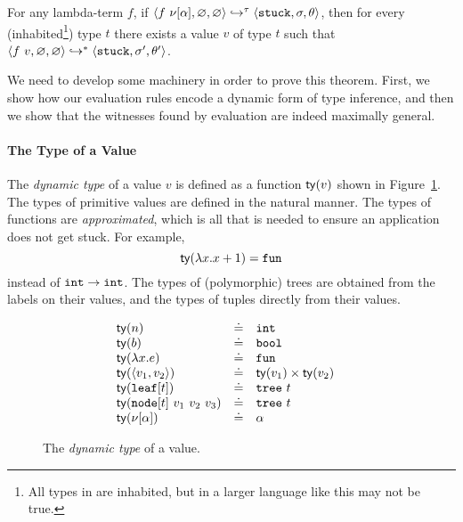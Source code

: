 \begin{thm}
\label{thm:soundness}
  For any lambda-term $f$, if
  \hbox{$\langle f\ \nu[\alpha], \varnothing, \varnothing \rangle \hookrightarrow^{\tau} \langle \mathtt{stuck}, \sigma, \theta \rangle$,}
  then for every
  (inhabited\footnote{All types in \lang are inhabited, but in a larger language like \ocaml this may not be true.})
  type
  $t$ there exists a value $v$ of type $t$ such that
  $\langle f\ v, \varnothing, \varnothing \rangle \hookrightarrow^{*} \langle \mathtt{stuck}, \sigma', \theta' \rangle{}$.
\end{thm}

We need to develop some machinery in order to prove this theorem.
First, we show how our evaluation rules encode a dynamic form of
type inference, and then we show that the witnesses found by
evaluation are indeed maximally general.

\paragraph{The Type of a Value} The \emph{dynamic type}
of a value $v$ is defined as a function $\mathsf{ty}(v)$ shown
in Figure~\ref{fig:typeof}.
%
The types of primitive values are defined in the natural manner.
%
The types of functions are \emph{approximated}, which is all
that is needed to ensure an application does not get stuck.
%
For example,
$$\mathsf{ty}(\lambda x. x + 1) = \mathtt{fun}$$
instead of $\mathtt{int} \rightarrow \mathtt{int}$.
%
The types of (polymorphic) trees are obtained from the labels on their
values, and the types of tuples directly from their values.

\begin{figure}[t]
\[ \begin{array}{lcll}
    \mathsf{ty}(n)   & \doteq & \mathtt{int} & \\
    \mathsf{ty}(b)   & \doteq & \mathtt{bool} & \\
    \mathsf{ty}(\lambda x. e) & \doteq & \mathtt{fun} \\
    \mathsf{ty}(\langle v_1, v_2 \rangle) & \doteq & \mathsf{ty}(v_1) \times \mathsf{ty}(v_2) \\
    \mathsf{ty}(\mathtt{leaf}[t]) & \doteq & \mathtt{tree}\ t \\
    \mathsf{ty}(\mathtt{node}[t]\ v_1\ v_2\ v_3) & \doteq & \mathtt{tree}\ t \\
    \mathsf{ty}(\nu[\alpha]) & \doteq & \alpha \\
  \end{array} \]
\caption{The \emph{dynamic type} of a value.}
\label{fig:typeof}
\end{figure}

